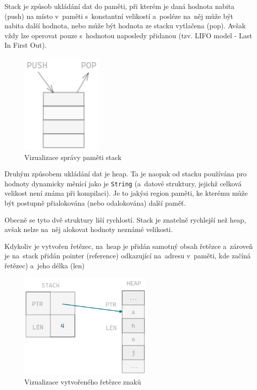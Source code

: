 \documentclass[a4paper, 12pt, twoside]{article} %
\begin{document}
				Stack je způsob ukládání dat do paměti, při kterém je daná hodnota nabita (push) na místo v~paměti s~konstantní velikostí a~posléze na~něj může být nabita další hodnota, nebo může být hodnota ze stacku vytlačena (pop). Avšak vždy lze operovat pouze s~hodnotou naposledy přidanou (tzv. LIFO model - Last In First Out).
				\begin{center}
					\begin{figure}[H]
						\centering
						\includegraphics[width=4cm]{stack}
						\caption{Vizualizace správy paměti stack}
						\label{fig:my_label_2}
					\end{figure}
				\end{center}
	
				Druhým způsobem ukládání dat je heap. Ta je naopak od stacku používána pro hodnoty dynamicky měnící jako je \texttt{String} (a~datové struktury, jejichž celková velikost není známa při kompilaci). Je to jakýsi region paměti, ke kterému může být postupně přialokována (nebo odalokována) další paměť.

				Obecně se tyto dvě struktury liší rychlostí. Stack je znatelně rychlejší než heap, avšak nelze na~něj alokovat hodnoty neznámé velikosti.
	
				Kdykoliv je vytvořen řetězec, na~heap je přidán samotný obsah řetězce a~zároveň je na~stack přidán pointer (reference) odkazující na~adresu v~paměti, kde začíná řetězec) a~jeho délka (len)
					
				\begin{center}
					\begin{figure}[H]
						\centering
						\includegraphics[width=6.5cm]{string_heap}
						\caption{Vizualizace vytvořeného řetězce znaků}
						\label{fig:my_label_3}
					\end{figure}
				\end{center}
\end{document}
